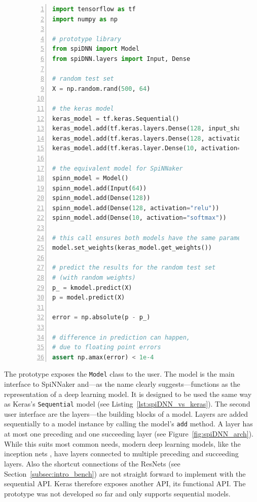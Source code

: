 \documentclass[]{article}
\begin{document}
\begin{figure} %
\begin{lstlisting}[language=Python, caption={Example code comparing
  Keras to the prototype. The code would result in a model akin to the
  one shown in Figure~\ref{fig:spiDNN_arch}.}, captionpos=b,
  label=lst:spiDNN_vs_keras, numbers=left]
import tensorflow as tf
import numpy as np

# prototype library
from spiDNN import Model
from spiDNN.layers import Input, Dense

# random test set
X = np.random.rand(500, 64)

# the keras model
keras_model = tf.keras.Sequential()
keras_model.add(tf.keras.layers.Dense(128, input_shape=(64,)))
keras_model.add(tf.keras.layers.Dense(128, activation="relu"))
keras_model.add(tf.keras.layer.Dense(10, activation="softmax"))

# the equivalent model for SpiNNaker
spinn_model = Model()
spinn_model.add(Input(64))
spinn_model.add(Dense(128))
spinn_model.add(Dense(128, activation="relu"))
spinn_model.add(Dense(10, activation="softmax"))

# this call ensures both models have the same parameters
model.set_weights(keras_model.get_weights())

# predict the results for the random test set
# (with random weights)
p_ = kmodel.predict(X)
p = model.predict(X)

error = np.absolute(p - p_)

# difference in prediction can happen,
# due to floating point errors
assert np.amax(error) < 1e-4
\end{lstlisting}
\end{figure} %

The prototype exposes the \texttt{Model} class to the user.
The model is the main interface to SpiNNaker and---as the name
clearly suggests---functions as the representation of a deep learning
model.
It is designed to be used the same way as Keras's \texttt{Sequential}
model (see Listing~\ref{lst:spiDNN_vs_keras}).
The second user interface are the layers---the building blocks of
a model.
Layers are added sequentially to a model instance by calling the
model's \texttt{add} method.
A layer has at most one preceding and one succeeding layer
(see Figure~\ref{fig:spiDNN_arch}).
While this suits most common needs, modern deep learning models,
like the inception nets \citep{szegedy_et_al_2014}, have layers
connected to multiple preceding and succeeding layers.
Also the shortcut connections of the ResNets (see
Section~\ref{subsec:intro_bench}) are not straight forward to
implement with the sequential API.
Keras therefore exposes another API, its functional API.
The prototype was not developed so far and only supports sequential
models.
\end{document}
